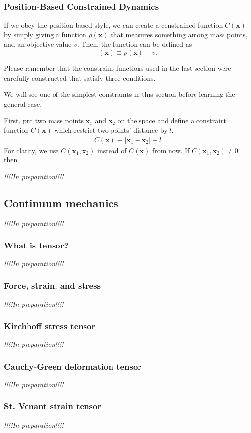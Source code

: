 \documentclass[pdflatex,sn-mathphys-num]{sn-jnl}%
\theoremstyle{thmstyleone}%
\theoremstyle{thmstyletwo}%
\theoremstyle{thmstylethree}%
\newcommand{\inprep}{
	\begin{center}
		\sl\rm {!!!!In preparation!!!!}
\end{center}}
\begin{document}
\subsubsection{Position-Based Constrained Dynamics}
If we obey the position-based style, we can create a constrained function $C(\boldsymbol{x})$ by simply giving a function $\rho(\boldsymbol{x})$ that measures something among mass points, and an objective value $v$. Then, the function can be defined as
\begin{equation}
	(\boldsymbol{x}) \equiv \rho(\boldsymbol{x}) - v.
\end{equation}

Please remember that the constraint functions used in the last section were carefully constructed that satisfy three conditions.

We will see one of the simplest constraints in this section before learning the general case.

First, put two mass points $\boldsymbol{x}_1$ and $\boldsymbol{x}_2$ on the space and define a constraint function $C(\boldsymbol{x})$ which restrict two points' distance by $l$.
\begin{eqnarray}
	C(\boldsymbol{x}) \equiv | \boldsymbol{x}_1 - \boldsymbol{x}_2 | - l
\end{eqnarray}
For clarity, we use $C(\boldsymbol{x}_1,\boldsymbol{x}_2)$ instead of $C(\boldsymbol{x})$ from now.
If $C(\boldsymbol{x}_1,\boldsymbol{x}_2) \neq 0$ then 


\inprep
\subsection{Continuum mechanics}
\inprep
\subsubsection{What is tensor?}
\inprep
\subsubsection{Force, strain, and stress}
\inprep
\subsubsection{Kirchhoff stress tensor}
\inprep
\subsubsection{Cauchy-Green deformation tensor}
\inprep
\subsubsection{St. Venant strain tensor}
\inprep
\end{document}
